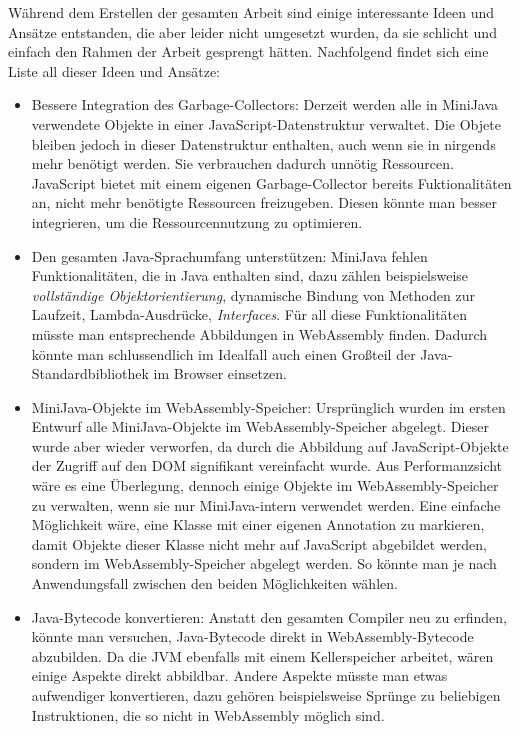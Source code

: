 Während dem Erstellen der gesamten Arbeit sind einige interessante Ideen und Ansätze entstanden, die aber leider nicht umgesetzt wurden, da sie schlicht und einfach den Rahmen der Arbeit gesprengt hätten. Nachfolgend findet sich eine Liste all dieser Ideen und Ansätze:
\begin{itemize}
    \item Bessere Integration des Garbage-Collectors: Derzeit werden alle in MiniJava verwendete Objekte in einer JavaScript-Datenstruktur verwaltet. Die Objete bleiben jedoch in dieser Datenstruktur enthalten, auch wenn sie in nirgends mehr benötigt werden. Sie verbrauchen dadurch unnötig Ressourcen. JavaScript bietet mit einem eigenen Garbage-Collector bereits Fuktionalitäten an, nicht mehr benötigte Ressourcen freizugeben. Diesen könnte man besser integrieren, um die Ressourcennutzung zu optimieren.
    \item Den gesamten Java-Sprachumfang unterstützen: MiniJava fehlen Funktionalitäten, die in Java enthalten sind, dazu zählen beispielsweise \emph{vollständige Objektorientierung}, dynamische Bindung von Methoden zur Laufzeit, Lambda-Ausdrücke, \emph{Interfaces}. Für all diese Funktionalitäten müsste man entsprechende Abbildungen in WebAssembly finden. Dadurch könnte man schlussendlich im Idealfall auch einen Großteil der Java-Standardbibliothek im Browser einsetzen.
    \item MiniJava-Objekte im WebAssembly-Speicher: Ursprünglich wurden im ersten Entwurf alle MiniJava-Objekte im WebAssembly-Speicher abgelegt. Dieser wurde aber wieder verworfen, da durch die Abbildung auf JavaScript-Objekte der Zugriff auf den DOM signifikant vereinfacht wurde. Aus Performanzsicht wäre es eine Überlegung, dennoch einige Objekte im WebAssembly-Speicher zu verwalten, wenn sie nur MiniJava-intern verwendet werden. Eine einfache Möglichkeit wäre, eine Klasse mit einer eigenen Annotation zu markieren, damit Objekte dieser Klasse nicht mehr auf JavaScript abgebildet werden, sondern im WebAssembly-Speicher abgelegt werden. So könnte man je nach Anwendungsfall zwischen den beiden Möglichkeiten wählen.
    \item Java-Bytecode konvertieren: Anstatt den gesamten Compiler neu zu erfinden, könnte man versuchen, Java-Bytecode direkt in WebAssembly-Bytecode abzubilden. Da die JVM ebenfalls mit einem Kellerspeicher arbeitet, wären einige Aspekte direkt abbildbar. Andere Aspekte müsste man etwas aufwendiger konvertieren, dazu gehören beispielsweise Sprünge zu beliebigen Instruktionen, die so nicht in WebAssembly möglich sind.

\end{itemize}
